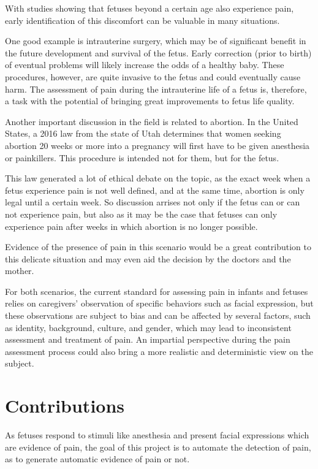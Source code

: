 \documentclass[msc]{ppgccufmg}
\begin{document}
With studies showing that fetuses beyond a certain age also experience pain, early identification of this discomfort can be valuable in many situations.

One good example is intrauterine surgery, which may be of significant benefit in the future development and survival of the fetus. Early correction (prior to birth) of eventual problems will likely increase the odds of a healthy baby. These procedures, however, are quite invasive to the fetus and could eventually cause harm. The assessment of pain during the intrauterine life of a fetus is, therefore, a task with the potential of bringing great improvements to fetus life quality.

Another important discussion in the field is related to abortion. In the United States, a 2016 law from the state of Utah determines that women seeking abortion 20 weeks or more into a pregnancy will first have to be given anesthesia or painkillers. This procedure is intended not for them, but for the fetus. 

This law generated a lot of ethical debate on the topic, as the exact week when a fetus experience pain is not well defined, and at the same time, abortion is only legal until a certain week. So discussion arrises not only if the fetus can or can not experience pain, but also as it may be the case that fetuses can only experience pain after weeks in which abortion is no longer possible.

Evidence of the presence of pain in this scenario would be a great contribution to this delicate situation and may even aid the decision by the doctors and the mother.

For both scenarios, the current standard for assessing pain in infants and fetuses relies on caregivers’ observation of specific behaviors such as facial expression, but these observations are subject to bias and can be affected by several factors, such as identity, background, culture, and gender, which may lead to inconsistent assessment and treatment of pain. An impartial perspective during the pain assessment process could also bring a more realistic and deterministic view on the subject.

\section{Contributions}

As fetuses respond to stimuli like anesthesia and present facial expressions which are evidence of pain, the goal of this project is to automate the detection of pain, as to generate automatic evidence of pain or not. 
\end{document}
